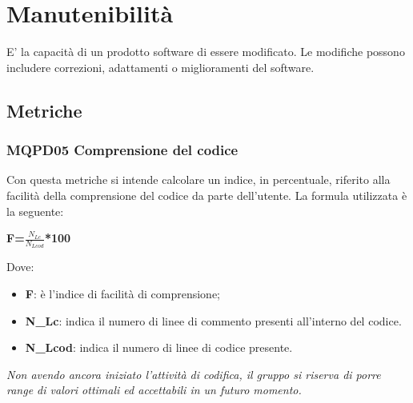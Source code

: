 \section{Manutenibilità} \label{3.6}
E' la capacità di un prodotto software di essere modificato. Le modifiche possono includere correzioni, adattamenti o miglioramenti del software.
\subsection{Metriche} \label{3.6.1}
\subsubsection{MQPD05 Comprensione del codice}
Con questa metriche si intende calcolare un indice, in percentuale, riferito alla facilità della comprensione del codice da parte dell'utente.
La formula utilizzata è la seguente:
\begin{center}
	\textbf{F=$\frac{N_{Lc}}{N_{Lcod}}$*100}
\end{center}
Dove:
\begin{itemize}
	\item \textbf{F}: è l'indice di facilità di comprensione;
	\item \textbf{N\_{Lc}}: indica il numero di linee di commento presenti all'interno del codice.
	\item \textbf{N\_{Lcod}}: indica il numero di linee di codice presente.
\end{itemize}

\textit{Non avendo ancora iniziato l'attività di codifica, il gruppo si riserva di porre range di valori ottimali ed accettabili in un futuro momento.}